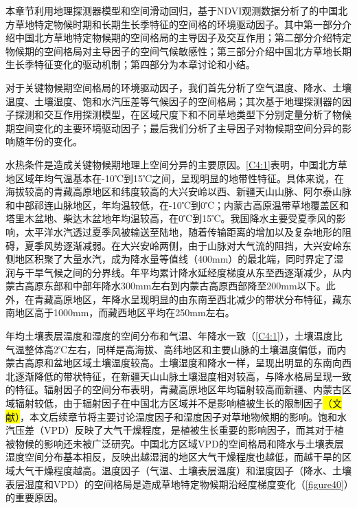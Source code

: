 

本章节利用地理探测器模型和空间滑动回归，基于NDVI观测数据分析了的中国北方草地特定物候时期和长期生长季特征的空间格的环境驱动因子。其中第一部分介绍中国北方草地特定物候期的空间格局的主导因子及交互作用；第二部分介绍特定物候期的空间格局对主导因子的空间气候敏感性；第三部分介绍中国北方草地长期生长季特征变化的驱动机制；第四部分为本章讨论和小结。


对于关键物候期空间格局的环境驱动因子，我们首先分析了空气温度、降水、土壤温度、土壤湿度、饱和水汽压差等气候因子的空间格局；其次基于地理探测器的因子探测和交互作用探测模型，在区域尺度下和不同草地类型下分别定量分析了物候期空间变化的主要环境驱动因子；最后我们分析了主导因子对物候期空间分异的影响随年份的变化。


水热条件是造成关键物候期地理上空间分异的主要原因。\cref{C4:1}表明，中国北方草地区域年均气温基本在-10℃到15℃之间，呈现明显的地带性特征。具体来说，在海拔较高的青藏高原地区和纬度较高的大兴安岭以西、新疆天山山脉、阿尔泰山脉和中部祁连山脉地区，年均温较低，在-10℃到0℃；内蒙古高原温带草地覆盖区和塔里木盆地、柴达木盆地年均温较高，在0℃到15℃。我国降水主要受夏季风的影响，太平洋水汽透过夏季风被输送至陆地，随着传输距离的增加以及复杂地形的阻碍，夏季风势逐渐减弱。在大兴安岭两侧，由于山脉对大气流的阻挡，大兴安岭东侧地区积聚了大量水汽，成为降水量等值线（400mm）的最北端，同时界定了湿润与干旱气候之间的分界线。年平均累计降水延经度梯度从东至西逐渐减少，从内蒙古高原东部和中部年降水300mm左右到内蒙古高原西部降至200mm以下。此外，在青藏高原地区，年降水呈现明显的由东南至西北减少的带状分布特征，藏东南地区高于1000mm，而藏西地区平均在250mm左右。

年均土壤表层温度和湿度的空间分布和气温、年降水一致（\cref{C4:1}），土壤温度比气温整体高2℃左右，同样是高海拔、高纬地区和主要山脉的土壤温度偏低，而内蒙古高原和盆地区域土壤温度较高。土壤湿度和降水一样，呈现出明显的东南向西北逐渐降低的带状特征，在新疆天山山脉土壤湿度相对较高，与降水格局呈现一致的特征。辐射因子的空间分布表明，青藏高原地区年均辐射较高而新疆、内蒙古区域辐射较低，由于辐射因子在中国北方区域并不是影响植被生长的限制因子\colorbox{yellow}{（文献）}，本文后续章节将主要讨论温度因子和湿度因子对草地物候期的影响。饱和水汽压差（VPD）反映了大气干燥程度，是植被生长重要的影响因子，而其对于植被物候的影响还未被广泛研究。中国北方区域VPD的空间格局和降水与土壤表层湿度空间分布基本相反，反映出越湿润的地区大气干燥程度也越低，而越干旱的区域大气干燥程度越高。温度因子（气温、土壤表层温度）和湿度因子（降水、土壤表层湿度和VPD）的空间格局是造成草地特定物候期沿经度梯度变化（\cref{figure40}）的重要原因。

